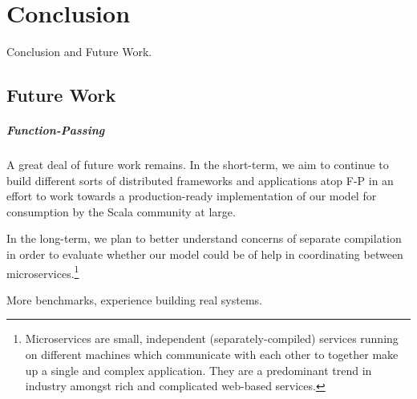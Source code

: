 \chapter*{Conclusion}

Conclusion and Future Work.

\section{Future Work}

\paragraph{Function-Passing} A great deal of future work remains. In the
short-term, we aim to continue to build different sorts of distributed
frameworks and applications atop F-P in an effort to work towards a
production-ready implementation of our model for consumption by the Scala
community at large.

In the long-term, we plan to better understand concerns of separate compilation
in order to evaluate whether our model could be of help in coordinating between
microservices.\footnote{Microservices are small, independent
(separately-compiled) services running on different machines which communicate
with each other to together make up a single and complex application. They are a
predominant trend in industry amongst rich and complicated web-based services.}

More benchmarks, experience building real systems.
